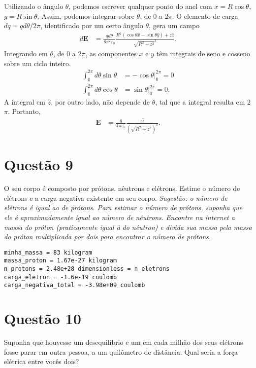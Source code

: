 \documentclass[11pt]{article}
\begin{document}
Utilizando o ângulo \(\theta\), podemos escrever qualquer ponto do anel
com \(x=R\cos\theta\), \(y=R\sin\theta\). Assim, podemos integrar sobre
\(\theta\), de \(0\) a \(2\pi\). O elemento de carga \(dq = qd\theta/2\pi\),
identificado por um certo ângulo \(\theta\), gera um campo
\begin{align*}
  d\mathbf E &= \frac{qd\theta}{8\pi^2\varepsilon_0}
               \frac{R^2(\cos\theta\hat x+\sin\theta\hat y)+z\hat{z}}
               {\sqrt{R^2+z^2}^3}.
\end{align*}
Integrando em \(\theta\), de 0 a 2\(\pi\), as componentes \(x\) e \(y\) têm
integrais de seno e cosseno sobre um ciclo inteiro. 
\begin{align*}
  \int_0^{2\pi} d\theta\sin\theta &= -\cos\theta\Big\vert_0^{2\pi} = 0\\
  \int_0^{2\pi} d\theta\cos\theta &= \sin\theta\Big\vert_0^{2\pi} = 0.
\end{align*}
A integral em \(\hat z\), por outro lado, não depende de \(\theta\), tal que
a integral resulta em 2\(\pi\). Portanto, 
\begin{align*}
  \mathbf E &= \frac{q}{4\pi\varepsilon_0}\frac{z\hat z}{(\sqrt{R^2+z^2})^3}.
\end{align*}
\section{Questão 9}
\label{sec:orgf9a26a1}
O seu corpo é composto por prótons, nêutrons e elétrons. Estime o número
de elétrons e a carga negativa existente em seu corpo. \emph{Sugestão: o}
\emph{número de elétrons é igual ao de prótons. Para estimar o número de}
\emph{prótons, suponha que ele é aproximadamente igual ao número de}
\emph{nêutrons. Encontre na internet a massa do próton (praticamente igual à}
\emph{do nêutron) e divida sua massa pela massa do próton multiplicada por}
\emph{dois para encontrar o número de prótons.}

\begin{verbatim}
minha_massa = 83 kilogram 
massa_proton = 1.67e-27 kilogram 
n_protons = 2.48e+28 dimensionless = n_eletrons
carga_eletron = -1.6e-19 coulomb
carga_negativa_total = -3.98e+09 coulomb
\end{verbatim}

\section{Questão 10}
\label{sec:org5d589e2}
Suponha que houvesse um desequilíbrio e um em cada milhão dos seus
elétrons fosse parar em outra pessoa, a um quilômetro de distância. Qual
seria a força elétrica entre vocês dois?
\end{document}
